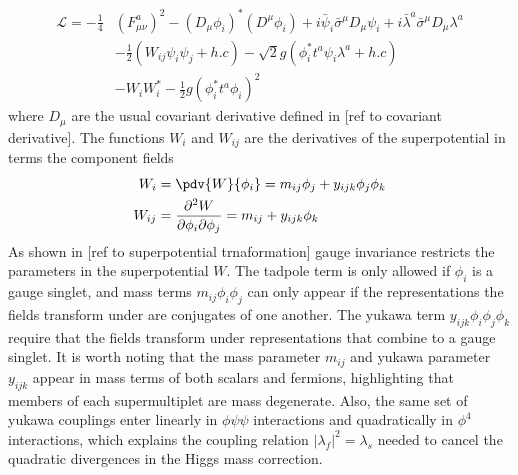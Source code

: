 \begin{align}\label{eq:component superLagrangian}
    \mathcal{L}=-\frac{1}{4}&(F_{\mu\nu}^{a})^{2}-(D_{\mu}\phi_{i})^{*}(D^{\mu}\phi_{i})+i\bar{\psi}_{i}\bar{\sigma}^{\mu}D_{\mu}\psi_{i}+i\bar{\lambda}^{a}\bar{\sigma}^{\mu}D_{\mu}\lambda^{a}
    \\
    &-\frac{1}{2}(W_{ij}\psi_{i}\psi_{j}+h.c)-\sqrt{2}g(\phi_{i}^{*}t^{a}\psi_{i}\lambda^{a}+h.c)
    \\
    &-W_{i}W_{i}^{*}-\frac{1}{2}g(\phi_{i}^{*}t^{a}\phi_{i})^{2}
\end{align}
where $D_{\mu}$ are the usual covariant derivative defined in [ref to covariant derivative]. The functions $W_{i}$ and $W_{ij}$ are the derivatives of the superpotential in terms the component fields
\begin{align}
    W_{i}&=\pdv{W}{\phi_{i}}=m_{ij}\phi_{j}+y_{ijk}\phi_{j}\phi_{k}
    \\
    W_{ij}&=\frac{\partial^{2}W}{\partial\phi_{i}\partial\phi_{j}}=m_{ij}+y_{ijk}\phi_{k}
\end{align}
As shown in [ref to superpotential trnaformation] gauge invariance restricts the parameters in the superpotential $W$. The tadpole term is only allowed if $\phi_{i}$ is a gauge singlet, and mass terms $m_{ij}\phi_{i}\phi_{j}$ can only appear if the representations the fields transform under are conjugates of one another. The yukawa term $y_{ijk}\phi_{i}\phi_{j}\phi_{k}$ require that the fields transform under representations that combine to a gauge singlet. It is worth noting that the mass parameter $m_{ij}$ and yukawa parameter $y_{ijk}$ appear in mass terms of both scalars and fermions, highlighting that members of each supermultiplet are mass degenerate. Also, the same set of yukawa couplings enter linearly in $\phi\psi\psi$ interactions and quadratically in $\phi^{4}$ interactions, which explains the coupling relation $|\lambda_{f}|^{2}=\lambda_{s}$
needed to cancel the quadratic divergences in the Higgs mass correction.


